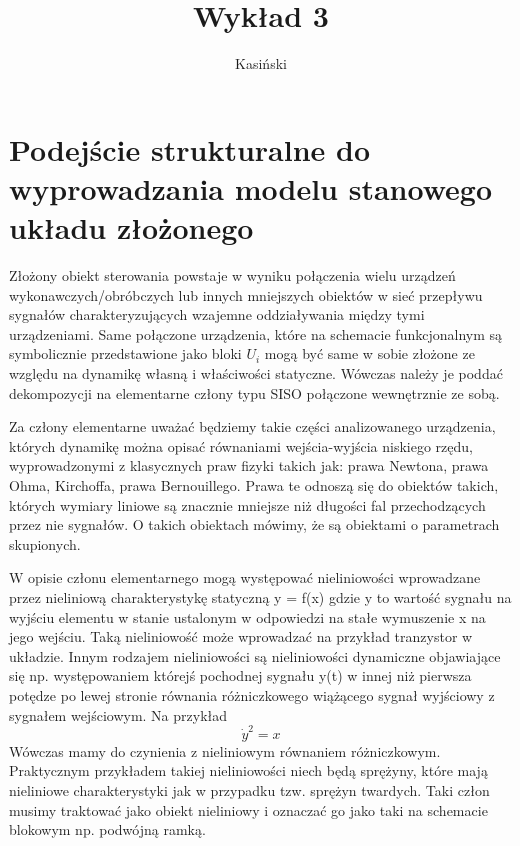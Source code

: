 \documentclass{article}
\author{Kasiński}
\title{Wykład 3}
\begin{document}
	\maketitle
	\section{Podejście strukturalne do wyprowadzania modelu stanowego układu złożonego}

		Złożony obiekt sterowania powstaje w wyniku połączenia wielu urządzeń wykonawczych/obróbczych lub
		innych mniejszych obiektów  w sieć przepływu sygnałów charakteryzujących wzajemne
		oddziaływania między tymi urządzeniami.
		Same połączone urządzenia, które na schemacie funkcjonalnym są
		symbolicznie przedstawione jako bloki $U_i$ mogą być same w sobie złożone ze względu na
		dynamikę własną i właściwości statyczne. Wówczas należy je poddać dekompozycji na
		elementarne człony typu SISO połączone wewnętrznie ze sobą.
		
		Za człony elementarne uważać będziemy takie części analizowanego urządzenia, których
		dynamikę można opisać równaniami wejścia-wyjścia niskiego rzędu,
		wyprowadzonymi z klasycznych praw fizyki takich jak: prawa Newtona, prawa Ohma,
		Kirchoffa, prawa Bernouillego. Prawa te odnoszą się do obiektów
		takich, których wymiary liniowe są znacznie mniejsze niż długości fal
		przechodzących przez nie sygnałów. O takich obiektach mówimy, że są obiektami
		o parametrach skupionych.

		W opisie członu elementarnego mogą występować nieliniowości wprowadzane przez
		nieliniową charakterystykę statyczną y = f(x) gdzie y to wartość sygnału na
		wyjściu elementu w stanie ustalonym w odpowiedzi na stałe wymuszenie
		x na jego wejściu.
		Taką nieliniowość może wprowadzać na przykład tranzystor w układzie.
		Innym rodzajem nieliniowości są nieliniowości dynamiczne objawiające się np. występowaniem
		którejś pochodnej sygnału y(t) w innej niż pierwsza potędze po lewej stronie równania
		różniczkowego wiążącego sygnał wyjściowy z sygnałem wejściowym.
		Na przykład
		\begin{equation}
			\dot{y}^2 = x 
		\end{equation}
		Wówczas mamy do
		czynienia z nieliniowym równaniem różniczkowym.
		Praktycznym przykładem takiej nieliniowości niech będą
		sprężyny, które mają nieliniowe charakterystyki jak w przypadku tzw. sprężyn twardych.
		Taki człon musimy traktować jako
		obiekt nieliniowy i oznaczać go jako taki na schemacie blokowym np. podwójną ramką.
\end{document}
